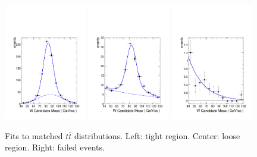 \begin{figure}[h!]
\centering
                \includegraphics[width=0.32\textwidth]{EXO-12-024/figs/WtagSF/MT.pdf}
                \includegraphics[width=0.32\textwidth]{EXO-12-024/figs/WtagSF/ML.pdf}
                \includegraphics[width=0.32\textwidth]{EXO-12-024/figs/WtagSF/MF.pdf}
\caption{Fits to matched $t\overline{t}$ distributions. Left: tight region. Center: loose region. Right: failed events.}\label{fig:fitsmatched}
\end{figure}

